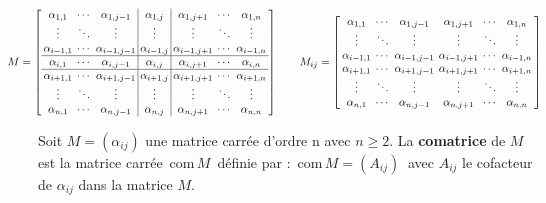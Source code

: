 \(\displaystyle \arraycolsep=0.07cm\def\arraystretch{1}  \hspace{-1cm}M= \left[
\begin{array}{ccc|c|ccc}
     \alpha_{1,1} & \cdots & \alpha_{1,j-1} & \alpha_{1,j} & \alpha_{1,j+1} & \cdots & \alpha_{1,n} \\
     \vdots & \ddots & \vdots & \vdots & \vdots & \ddots & \vdots \\
     \alpha_{i-1,1} & \cdots & \alpha_{i-1,j-1} & \alpha_{i-1,j} & \alpha_{i-1, j+1} & \cdots & \alpha_{i-1, n}\\ \hline
     \alpha_{i,1} & \cdots & \alpha_{i,j-1} & \alpha_{i,j} & \alpha_{i, j+1} & \cdots & \alpha_{i, n} \\ \hline
     \alpha_{i+1,1} & \cdots & \alpha_{i+1,j-1} & \alpha_{i+1,j} & \alpha_{i+1, j+1} & \cdots & \alpha_{i+1, n} \\ 
     \vdots & \ddots & \vdots & \vdots & \vdots & \ddots & \vdots \\
     \alpha_{n,1} & \cdots & \alpha_{n,j-1} & \alpha_{n,j} & \alpha_{n, j+1} & \cdots & \alpha_{n, n}
\end{array}
\right]
\qquad 
M_{ij}= \left[
\begin{array}{cccccc}
     \alpha_{1,1} & \cdots & \alpha_{1,j-1} &  \alpha_{1,j+1} & \cdots & \alpha_{1,n} \\
     \vdots & \ddots & \vdots &  \vdots & \ddots & \vdots \\
     \alpha_{i-1,1} & \cdots & \alpha_{i-1,j-1} & \alpha_{i-1, j+1} & \cdots & \alpha_{i-1, n}\\
     \alpha_{i+1,1} & \cdots & \alpha_{i+1,j-1} &  \alpha_{i+1, j+1} & \cdots & \alpha_{i+1, n} \\
     \vdots & \ddots & \vdots &  \vdots & \ddots & \vdots \\
     \alpha_{n,1} & \cdots & \alpha_{n,j-1} & \alpha_{n, j+1} & \cdots & \alpha_{n, n}
\end{array}
\right]
\)

\vspace{1.3cm}

Soit \(M=(\alpha_{ij})\) une matrice carrée d'ordre n avec \(n\geq 2\). La  \textbf{comatrice} de \(M\) est la matrice carrée\, com\(\,M\)\, définie par :\, com\(\,M=(A_{ij})\ \) avec \(A_{ij}\) le cofacteur de \(\alpha_{ij}\) dans la matrice \(M\).

\newpage
